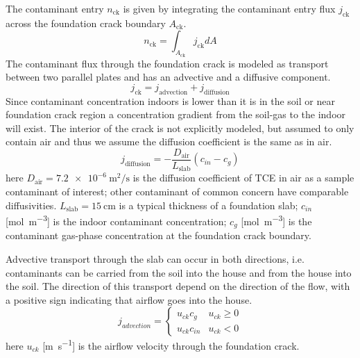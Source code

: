 The contaminant entry $n_\mathrm{ck}$ is given by integrating the contaminant entry flux $j_\mathrm{ck}$ across the foundation crack boundary $A_\mathrm{ck}$.
\begin{equation}
  n_\mathrm{ck} = \int_{A_\mathrm{ck}} j_\mathrm{ck} dA
\end{equation}
The contaminant flux through the foundation crack is modeled as transport between two parallel plates and has an advective and a diffusive component.
\begin{equation}
  j_\mathrm{ck} = j_\mathrm{advection} + j_\mathrm{diffusion}
\end{equation}
Since contaminant concentration indoors is lower than it is in the soil or near foundation crack region a concentration gradient from the soil-gas to the indoor will exist.
The interior of the crack is not explicitly modeled, but assumed to only contain air and thus we assume the diffusion coefficient is the same as in air.
\begin{equation}
  j_\mathrm{diffusion} = - \frac{D_\mathrm{air}}{L_\mathrm{slab}} (c_{in} - c_g)
\end{equation}
here $D_\mathrm{air} = \SI{7.2e-6}{\metre\squared\per\second}$ is the diffusion coefficient of TCE in air as a sample contaminant of interest; other contaminant of common concern have comparable diffusivities.
$L_\mathrm{slab} = \SI{15}{\centi\metre}$ is a typical thickness of a foundation slab;
$c_{in}$ [\si{\mol\per\metre\cubed}] is the indoor contaminant concentration;
$c_g$ [\si{\mol\per\metre\cubed}] is the contaminant gas-phase concentration at the foundation crack boundary.\par

Advective transport through the slab can occur in both directions, i.e. contaminants can be carried from the soil into the house and from the house into the soil\cite{holton_creation_2018}.
The direction of this transport depend on the direction of the flow, with a positive sign indicating that airflow goes into the house.
\begin{equation}
  j_{advection} = \begin{cases}
    u_{ck} c_g & u_{ck} \geq 0 \\
    u_{ck} c_{in} & u_{ck} < 0
\end{cases}
\end{equation}
here $u_{ck}$ [\si{\metre\per\second}] is the airflow velocity through the foundation crack.

